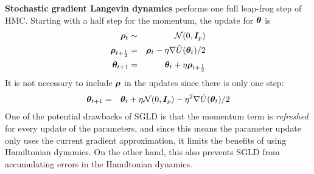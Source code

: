 \documentclass[]{article}
\begin{document}
{\bf Stochastic gradient Langevin dynamics} \cite{welling2011bayesian} performs one full leap-frog step of HMC.   Starting with a half step for the momentum, the update for ${\bm \theta}$ is 
\begin{eqnarray}
  {\bm \rho}_t & \sim & \mathcal{N}(0,{\bm I}_p) \\
  {\bm \rho}_{t+\frac{1}{2}} & = & {\bm \rho}_t - \eta \nabla \hat{U}({\bm \theta}_t) /2 \\
  {\bm \theta}_{t+1} & = & {\bm \theta}_t + \eta {\bm \rho}_{t+\frac{1}{2}}
\end{eqnarray}
It is not necessary to include ${\bm \rho}$ in the updates since there is only one step:
\begin{eqnarray}
  {\bm \theta}_{t+1} & = & {\bm \theta}_t + \eta \mathcal{N}(0,{\bm I}_p) - \eta^2 \nabla \hat{U}({\bm \theta}_t) /2 
\end{eqnarray}
One of the potential drawbacks of SGLD is that the momentum term is {\em refreshed} for every update of the parameters, and since this means the parameter update only uses the current gradient approximation, it limits the benefits of using Hamiltonian dynamics.  On the other hand, this also prevents SGLD from accumulating errors in the Hamiltonian dynamics.
\end{document}
